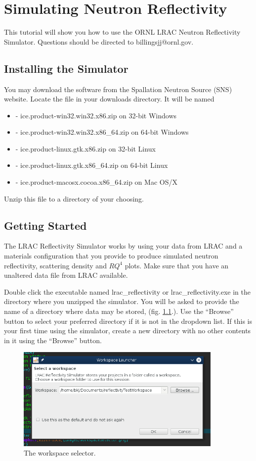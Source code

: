 \chapter{Simulating Neutron Reflectivity}

This tutorial will show you how to use the ORNL LRAC Neutron Reflectivity
Simulator. Questions should be directed to billingsjj@ornl.gov.

\section{Installing the Simulator}

You may download the software from the Spallation Neutron Source (SNS) website.
Locate the file in your downloads directory. It will be named
\begin{itemize}
  \item - ice.product-win32.win32.x86.zip on 32-bit Windows
  \item - ice.product-win32.win32.x86\_64.zip on 64-bit Windows
  \item - ice.product-linux.gtk.x86.zip on 32-bit Linux
  \item - ice.product-linux.gtk.x86\_64.zip on 64-bit Linux
  \item - ice.product-macosx.cocoa.x86\_64.zip on Mac OS/X
\end{itemize}

Unzip this file to a directory of your choosing. 

\section{Getting Started}

The LRAC Reflectivity Simulator works by using your data from LRAC and a
materials configuration that you provide to produce simulated
neutron reflectivity, scattering density and $RQ^4$ plots. Make sure that you
have an unaltered data file from LRAC available.

Double click the executable named lrac\_reflectivity or lrac\_reflectivity.exe
in the directory where you unzipped the simulator. You will be asked to provide the
name of a directory where data may be stored, (fig. \ref{workspace}.). Use the
``Browse'' button to select your preferred directory if it is not in the dropdown list. If
this is your first time using the simulator, create a new directory with no
other contents in it using the ``Browse'' button.

\begin{figure}[!h]
\centering
\includegraphics[width=10cm]{images/workspaceSelector.png}
\caption{The workspace selector.}
\label{workspace}
\end{figure}

